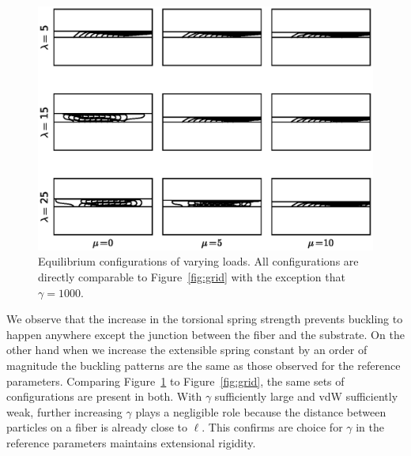 	\begin{figure}
		\begin{center}
			\includegraphics[scale=1]{./fig/ch4/grid_g1000.eps}
		\end{center}		
		\caption{Equilibrium configurations of varying loads. All configurations are directly comparable to Figure~\ref{fig:grid} with the exception that $\gamma = 1000$.
		\label{fig:grid_g1000}}
	\end{figure}
	
	We observe that the increase in the torsional spring strength prevents buckling to happen anywhere except the junction between the fiber and the substrate. On the other hand when we increase the extensible spring constant by an order of magnitude the buckling patterns are the same as those observed for the reference parameters. Comparing Figure~\ref{fig:grid_g1000} to Figure~\ref{fig:grid}, the same sets of configurations are present in both. With $\gamma$ sufficiently large and vdW sufficiently weak, further increasing $\gamma$ plays a negligible role because the distance between particles on a fiber is already close to $\ell$. This confirms are choice for $\gamma$ in the reference parameters maintains extensional rigidity.
	
